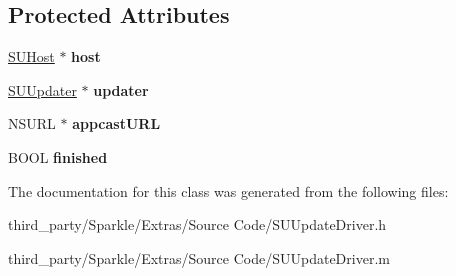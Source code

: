 \subsection*{Protected Attributes}
\begin{DoxyCompactItemize}
\item 
\mbox{\label{interface_s_u_update_driver_a8746319c2d7450889237bfaeadada565}} 
\mbox{\hyperlink{interface_s_u_host}{S\+U\+Host}} $\ast$ {\bfseries host}
\item 
\mbox{\label{interface_s_u_update_driver_abeef2d8ae76c5f94620cbc6d2460f1ea}} 
\mbox{\hyperlink{interface_s_u_updater}{S\+U\+Updater}} $\ast$ {\bfseries updater}
\item 
\mbox{\label{interface_s_u_update_driver_a077850e2c9cc18ad6a51e80bedaed928}} 
N\+S\+U\+RL $\ast$ {\bfseries appcast\+U\+RL}
\item 
\mbox{\label{interface_s_u_update_driver_a4005a61f07233ad58321d0b632ca45ae}} 
B\+O\+OL {\bfseries finished}
\end{DoxyCompactItemize}


The documentation for this class was generated from the following files\+:\begin{DoxyCompactItemize}
\item 
third\+\_\+party/\+Sparkle/\+Extras/\+Source Code/S\+U\+Update\+Driver.\+h\item 
third\+\_\+party/\+Sparkle/\+Extras/\+Source Code/S\+U\+Update\+Driver.\+m\end{DoxyCompactItemize}
